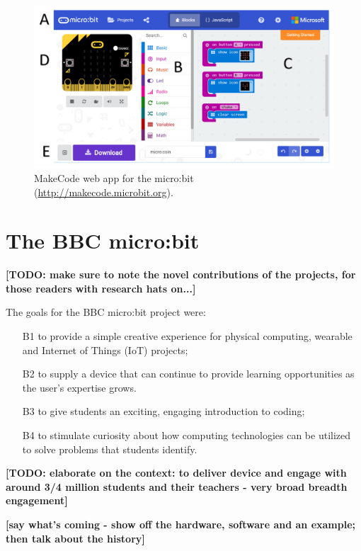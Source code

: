 \begin{figure}[t]
    \includegraphics[width=6in]{images/webApp.png}
    \caption{\label{fig:snapshot}MakeCode web app for the micro:bit (\url{http://makecode.microbit.org}).}
  \end{figure}

\section{The BBC micro:bit}
\label{sec:microbit}

{\bf [TODO: make sure to note the novel contributions of the projects, for those
readers with research hats on...]}

The goals for the BBC micro:bit project were:
\begin{itemize}
    \item[B1] to provide a simple creative experience for physical computing, wearable and Internet of Things (IoT) projects;
    \item[B2] to supply a device that can continue to provide learning opportunities as the user's expertise grows.
    \item[B3] to give students an exciting, engaging introduction to coding;
    \item[B4] to stimulate curiosity about how computing technologies can be utilized to solve problems that students identify.
\end{itemize}

{\bf [TODO: elaborate on the context:  to deliver device and engage
with around 3/4 million students and their teachers - very broad breadth engagement]}

{\bf [say what's coming - show off the hardware, software and an example; then
talk about the history]}

